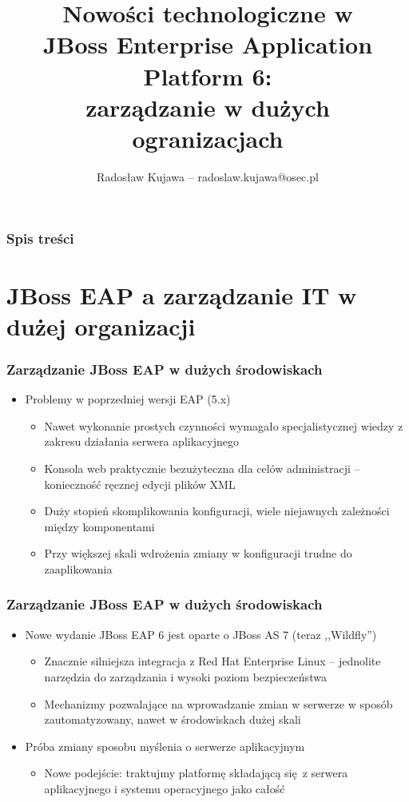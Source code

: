 \documentclass[dvipsnames,table]{beamer}
\title{Nowości technologiczne w \\ JBoss Enterprise Application Platform 6: \\ zarządzanie w dużych ogranizacjach}
\author{Radosław Kujawa -- radoslaw.kujawa@osec.pl}
\institute{OSEC}
\begin{document}
\begin{frame}
\titlepage
\end{frame}

\begin{frame}[allowframebreaks]
\frametitle{Spis treści}
{
\hypersetup{colorlinks=true,linkcolor=black,urlcolor=OSEC-red}
\tableofcontents
}
\end{frame}


\section{JBoss EAP a zarządzanie IT w dużej organizacji}

\begin{frame}
\frametitle{Zarządzanie JBoss EAP w dużych środowiskach}
\begin{itemize}
	\item Problemy w poprzedniej wersji EAP (5.x)
	\begin{itemize}
		\item Nawet wykonanie prostych czynności wymagało specjalistycznej wiedzy z zakresu działania serwera aplikacyjnego
		\item Konsola web praktycznie bezużyteczna dla celów administracji -- konieczność ręcznej edycji plików XML
		\item Duży stopień skomplikowania konfiguracji, wiele niejawnych zależności między komponentami
		\item Przy większej skali wdrożenia zmiany w konfiguracji trudne do zaaplikowania
	\end{itemize}
\end{itemize}
\end{frame}

\begin{frame}
\frametitle{Zarządzanie JBoss EAP w dużych środowiskach}
\begin{itemize}
	\item Nowe wydanie JBoss EAP 6 jest oparte o JBoss AS 7 (teraz ,,Wildfly'')
	\begin{itemize}
		\item Znacznie silniejsza integracja z Red Hat Enterprise Linux -- jednolite narzędzia do zarządzania i wysoki poziom bezpieczeństwa
		\item Mechanizmy pozwalające na wprowadzanie zmian w serwerze w sposób zautomatyzowany, nawet w środowiskach dużej skali
	\end{itemize}
	\item Próba zmiany sposobu myślenia o serwerze aplikacyjnym
	\begin{itemize}
		\item Nowe podejście: traktujmy platformę składającą się z serwera aplikacyjnego i systemu operacyjnego jako całość
	\end{itemize}
\end{itemize}
\end{frame}
\end{document}

